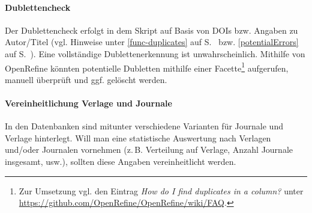 \paragraph{Dublettencheck} Der Dublettencheck erfolgt in dem Skript auf Basis von DOIs bzw. Angaben zu Autor/Titel (vgl. Hinweise unter \ref{func-duplicates} auf S.~\pageref{func-duplicates} bzw. \ref{potentialErrors} auf S.~\pageref{potentialErrors}). Eine vollständige Dublettenerkennung ist unwahrscheinlich. Mithilfe von OpenRefine könnten potentielle Dubletten mithilfe einer Facette\footnote{Zur Umsetzung vgl. den Eintrag \textit{How do I find duplicates in a column?} unter \url{https://github.com/OpenRefine/OpenRefine/wiki/FAQ}.} aufgerufen, manuell überprüft und ggf. gelöscht werden.

\paragraph{Vereinheitlichung Verlage und Journale} In den Datenbanken sind mitunter verschiedene Varianten für Journale und Verlage hinterlegt. Will man eine statistische Auswertung nach Verlagen und/oder Journalen vornehmen (z.\,B. Verteilung auf Verlage, Anzahl Journale insgesamt, usw.), sollten diese Angaben vereinheitlicht werden.
